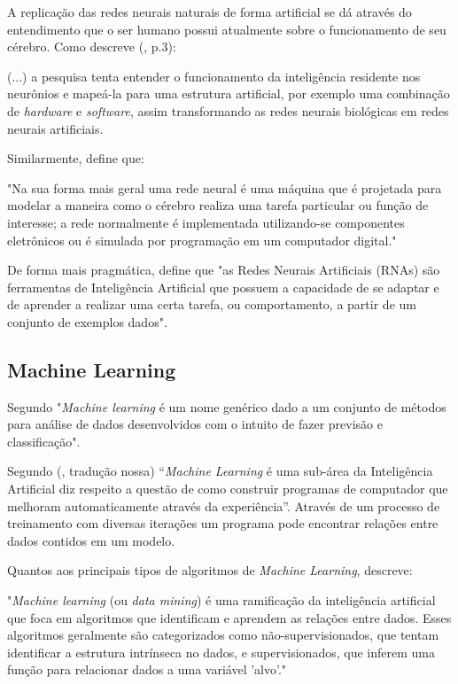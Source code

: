A replicação das redes neurais naturais de forma artificial se dá através do entendimento que o ser humano possui atualmente sobre o funcionamento de seu cérebro. Como descreve \citeauthor{rauber20} (\citeyear{rauber20}, p.3):

\begin{citacao}
(...) a pesquisa tenta entender o funcionamento da inteligência residente nos neurônios e mapeá-la para uma estrutura artificial, por exemplo uma combinação de \textit{hardware} e \textit{software}, assim transformando as redes neurais biológicas em redes neurais artificiais.
\end{citacao}

Similarmente,  define que:
\begin{citacao}
"Na sua forma mais geral uma rede neural é uma máquina que é projetada para modelar a maneira como o cérebro realiza uma tarefa particular ou função de interesse; a rede normalmente é implementada utilizando-se componentes eletrônicos ou é simulada por programação em um computador digital."
\end{citacao}

De forma mais pragmática,  define que "as Redes Neurais Artificiais (RNAs) são ferramentas de Inteligência Artificial que possuem a capacidade de se adaptar e de aprender a realizar uma certa tarefa, ou comportamento, a partir de um conjunto de exemplos dados". 

\subsection {Machine Learning}
Segundo  "\textit{Machine learning} é um nome genérico dado a um conjunto de métodos para análise de dados desenvolvidos com o intuito de fazer previsão e classificação".

Segundo \citeauthor{mitchell97} (\citeyear{mitchell97}, tradução nossa) “\textit{Machine Learning} é uma sub-área da Inteligência Artificial diz respeito a questão de como construir programas de computador que melhoram automaticamente através da experiência”. Através de um processo de treinamento com diversas iterações um programa pode encontrar relações entre dados contidos em um modelo. 

Quantos aos principais tipos de algoritmos de \textit{Machine Learning},  descreve:

\begin{citacao}
"\textit{Machine learning} (ou \textit{data mining}) é uma ramificação da inteligência artificial que foca em algoritmos que identificam e aprendem as relações entre dados. Esses algoritmos geralmente são categorizados como não-supervisionados, que tentam identificar a estrutura intrínseca no dados, e supervisionados, que inferem uma função para relacionar dados a uma variável 'alvo'."
\end{citacao}

